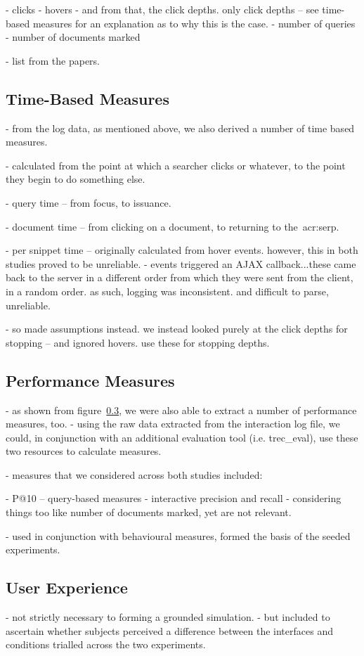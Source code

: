 - clicks
- hovers
- and from that, the click depths. only click depths -- see time-based measures for an explanation as to why this is the case.
- number of queries
- number of documents marked

- list from the papers.

\subsection{Time-Based Measures}
- from the log data, as mentioned above, we also derived a number of time based measures.

- calculated from the point at which a searcher clicks or whatever, to the point they begin to do something else.

- query time -- from focus, to issuance.

- document time -- from clicking on a document, to returning to the~\gls{acr:serp}.

- per snippet time -- originally calculated from hover events. however, this in both studies proved to be unreliable.
- events triggered an AJAX callback...these came back to the server in a different order from which they were sent from the client, in a random order. as such, logging was inconsistent. and difficult to parse, unreliable.

- so made assumptions instead. we instead looked purely at the click depths for stopping -- and ignored hovers. use these for stopping depths.

\subsection{Performance Measures}
- as shown from figure~\ref{}, we were also able to extract a number of performance measures, too.
- using the raw data extracted from the interaction log file, we could, in conjunction with an additional evaluation tool (i.e. trec\_eval), use these two resources to calculate measures.

- measures that we considered across both studies included:

- P@10 -- query-based measures
- interactive precision and recall
- considering things too like number of documents marked, yet are not relevant.

- used in conjunction with behavioural measures, formed the basis of the seeded experiments.

\subsection{User Experience}
- not strictly necessary to forming a grounded simulation.
- but included to ascertain whether subjects perceived a difference between the interfaces and conditions trialled across the two experiments.

